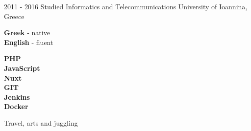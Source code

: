 \documentclass[10pt]{developercv}
\begin{document}


\begin{entrylist}
	\entry
		{2011 - 2016}
		{Studied Informatics and Telecommunications}
		{University of Ioannina, Greece}
		{}
\end{entrylist}


\begin{minipage}[t]{0.3\textwidth}
	\vspace{-\baselineskip}
	\textbf{Greek} - native\\
	\textbf{English} - fluent\\
\end{minipage}
\hfill
\begin{minipage}[t]{0.3\textwidth}
	\vspace{-\baselineskip}
	\textbf{PHP}\\
	\textbf{JavaScript}\\
	\textbf{Nuxt}\\
	\textbf{GIT}\\
	\textbf{Jenkins}\\
	\textbf{Docker}\\
\end{minipage}
\hfill
\begin{minipage}[t]{0.3\textwidth}
	\vspace{-\baselineskip}	
	Travel, arts and juggling
\end{minipage}

\end{document}

